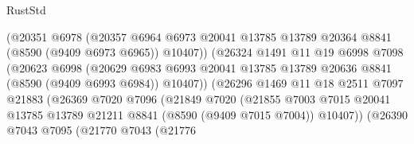 \begin{lexlean}{RustStd}
\begin{coremodule}
                                (@20351
                                  @6978
                                  (@20357
                                    @6964
                                    @6973
                                    @20041
                                    @13785
                                    @13789
                                    @20364
                                    @8841
                                    (@8590 (@9409 @6973 @6965))
                                    @10407))
                                (@26324
                                  @1491
                                  @11
                                  @19
                                  @6998
                                  @7098
                                  (@20623
                                    @6998
                                    (@20629
                                      @6983
                                      @6993
                                      @20041
                                      @13785
                                      @13789
                                      @20636
                                      @8841
                                      (@8590 (@9409 @6993 @6984))
                                      @10407))
                                  (@26296
                                    @1469
                                    @11
                                    @18
                                    @2511
                                    @7097
                                    @21883
                                    (@26369
                                      @7020
                                      @7096
                                      (@21849
                                        @7020
                                        (@21855
                                          @7003
                                          @7015
                                          @20041
                                          @13785
                                          @13789
                                          @21211
                                          @8841
                                          (@8590 (@9409 @7015 @7004))
                                          @10407))
                                      (@26390
                                        @7043
                                        @7095
                                        (@21770
                                          @7043
                                          (@21776

\end{coremodule}
\end{lexlean}

